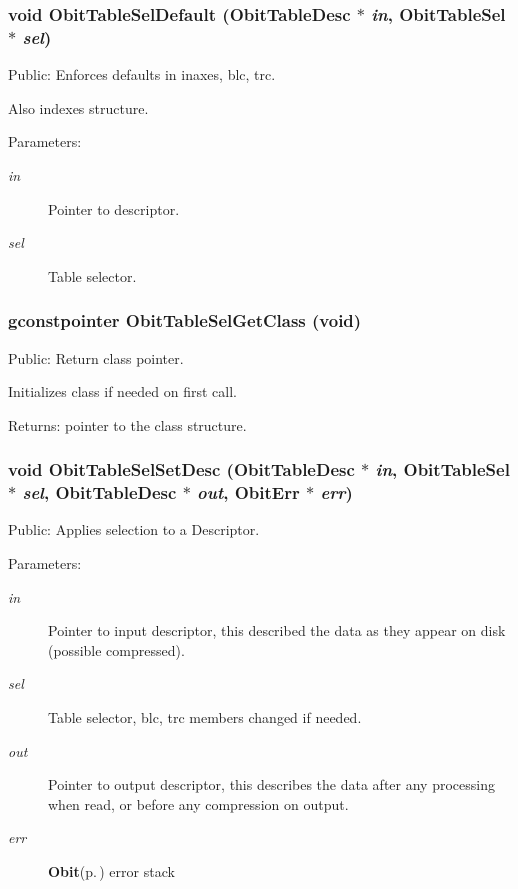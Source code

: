 \subsubsection{\setlength{\rightskip}{0pt plus 5cm}void Obit\-Table\-Sel\-Default ({\bf Obit\-Table\-Desc} $\ast$ {\em in}, {\bf Obit\-Table\-Sel} $\ast$ {\em sel})}\label{ObitTableSel_8h_a8}


Public: Enforces defaults in inaxes, blc, trc. 

Also indexes structure. \begin{Desc}
\item[Parameters:]
\begin{description}
\item[{\em in}]Pointer to descriptor. \item[{\em sel}]Table selector. \end{description}
\end{Desc}
\subsubsection{\setlength{\rightskip}{0pt plus 5cm}gconstpointer Obit\-Table\-Sel\-Get\-Class (void)}\label{ObitTableSel_8h_a5}


Public: Return class pointer. 

Initializes class if needed on first call. \begin{Desc}
\item[Returns:]pointer to the class structure. \end{Desc}
\subsubsection{\setlength{\rightskip}{0pt plus 5cm}void Obit\-Table\-Sel\-Set\-Desc ({\bf Obit\-Table\-Desc} $\ast$ {\em in}, {\bf Obit\-Table\-Sel} $\ast$ {\em sel}, {\bf Obit\-Table\-Desc} $\ast$ {\em out}, {\bf Obit\-Err} $\ast$ {\em err})}\label{ObitTableSel_8h_a9}


Public: Applies selection to a Descriptor. 

\begin{Desc}
\item[Parameters:]
\begin{description}
\item[{\em in}]Pointer to input descriptor, this described the data as they appear on disk (possible compressed). \item[{\em sel}]Table selector, blc, trc members changed if needed. \item[{\em out}]Pointer to output descriptor, this describes the data after any processing when read, or before any compression on output. \item[{\em err}]{\bf Obit}{\rm (p.\,\pageref{structObit})} error stack \end{description}
\end{Desc}
